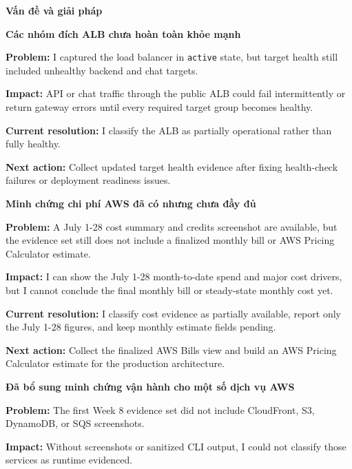 \vspace{0.5em}\noindent\textbf{Vấn đề và giải
pháp}\par

\vspace{0.5em}\noindent\textbf{Các nhóm đích ALB chưa hoàn toàn khỏe
mạnh}\par

\textbf{Problem:} I captured the load balancer in \texttt{active} state,
but target health still included unhealthy backend and chat targets.

\textbf{Impact:} API or chat traffic through the public ALB could fail
intermittently or return gateway errors until every required target
group becomes healthy.

\textbf{Current resolution:} I classify the ALB as partially operational
rather than fully healthy.

\textbf{Next action:} Collect updated target health evidence after
fixing health-check failures or deployment readiness issues.

\vspace{0.5em}\noindent\textbf{Minh chứng chi phí AWS đã có nhưng chưa đầy
đủ}\par

\textbf{Problem:} A July 1-28 cost summary and credits screenshot are
available, but the evidence set still does not include a finalized
monthly bill or AWS Pricing Calculator estimate.

\textbf{Impact:} I can show the July 1-28 month-to-date spend and major
cost drivers, but I cannot conclude the final monthly bill or
steady-state monthly cost yet.

\textbf{Current resolution:} I classify cost evidence as partially
available, report only the July 1-28 figures, and keep monthly estimate
fields pending.

\textbf{Next action:} Collect the finalized AWS Bills view and build an
AWS Pricing Calculator estimate for the production architecture.

\vspace{0.5em}\noindent\textbf{Đã bổ sung minh chứng vận hành cho một số dịch vụ
AWS}\par

\textbf{Problem:} The first Week 8 evidence set did not include
CloudFront, S3, DynamoDB, or SQS screenshots.

\textbf{Impact:} Without screenshots or sanitized CLI output, I could
not classify those services as runtime evidenced.

